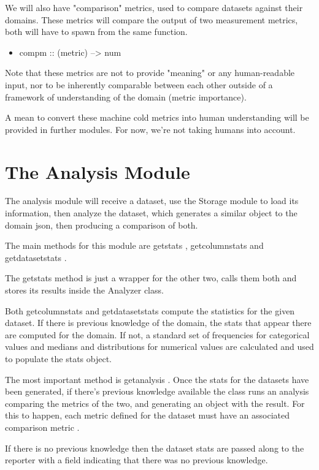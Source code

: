 We will also have "comparison" metrics, used to compare datasets against their domains.
These metrics will compare the output of two measurement metrics, both will have to
spawn from the same function.
\begin{itemize}
\item compm :: (metric) --> num
\end{itemize}

Note that these metrics are not to provide "meaning" or any human-readable input, nor to be
inherently comparable between each other outside of a framework of understanding of the domain
(metric importance).

A mean to convert these machine cold metrics into human understanding will be provided in further 
modules. For now, we're not taking humans into account.

\section{The Analysis Module}
\label{cap3:sec:analysis}

The analysis module will receive a dataset, use the Storage module to load its information, then analyze the dataset, which generates a similar object to the domain json, then producing a comparison of both.

The main methods for this module are  getstats ,  getcolumnstats  and  getdatasetstats .

The  getstats  method is just a wrapper for the other two, calls them both and stores its results inside the Analyzer class.

Both  getcolumnstats  and  getdatasetstats  compute the statistics for the given dataset. If there is previous knowledge of the domain, the stats that appear there are computed for the domain. If not, a standard set of frequencies for categorical values and medians and distributions for numerical values are calculated and used to populate the stats object.

The most important method is  getanalysis . Once the stats for the datasets have been generated, if there's previous knowledge available the class runs an analysis comparing the metrics of the two, and generating an object with the result. For this to happen, each metric defined for the dataset must have an associated  comparison metric .

If there is no previous knowledge then the dataset stats are passed along to the reporter with a field indicating that there was no previous knowledge.

